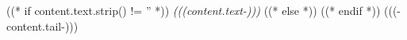 ((* if content.text.strip() != '' *)) \emph{(((content.text-)))} ((* else *))
((* endif *))
 (((-content.tail-))) 
